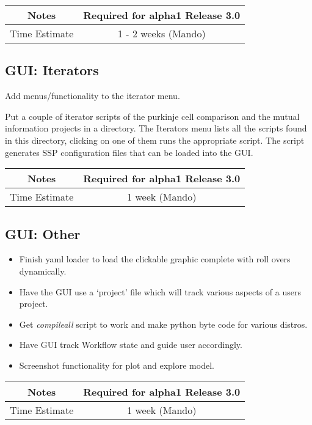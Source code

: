 \documentclass[12pt]{article}
\begin{document}
{
  \vspace{5mm}
  \centering
  \begin{tabular}{|c|c|}
    \hline
    Notes
    & Required for alpha1 Release 3.0 \\
    \hline
    Time Estimate
    & 1 - 2 weeks (Mando) \\
    \hline
  \end{tabular}
}


\subsection{GUI: Iterators}
Add menus/functionality to the iterator menu.

Put a couple of iterator scripts of the purkinje cell comparison and
the mutual information projects in a directory.  The Iterators menu
lists all the scripts found in this directory, clicking on one of them
runs the appropriate script.  The script generates SSP configuration
files that can be loaded into the GUI.

{
  \vspace{5mm}
  \centering
  \begin{tabular}{|c|c|}
    \hline
    Notes
    & Required for alpha1 Release 3.0 \\
    \hline
    Time Estimate
    & 1 week (Mando) \\
    \hline
  \end{tabular}
}


\subsection{GUI: Other}
\begin{itemize}
\item Finish yaml loader to load the clickable graphic complete with
  roll overs dynamically.
\item Have the GUI use a `project' file which will track various
  aspects of a users project.
\item Get {\it compileall} script to work and make python byte code for
  various distros.
\item Have GUI track Workflow state and guide user accordingly.
\item Screenshot functionality for plot and explore model.
\end{itemize}

{
  \vspace{5mm}
  \centering
  \begin{tabular}{|c|c|}
    \hline
    Notes
    & Required for alpha1 Release 3.0 \\
    \hline
    Time Estimate
    & 1 week (Mando)\\
    \hline
  \end{tabular}
}
\end{document}
